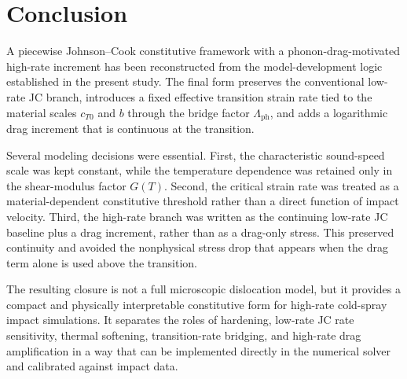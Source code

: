 \section{Conclusion}
A piecewise Johnson--Cook constitutive framework with a phonon-drag-motivated high-rate increment has been reconstructed from the model-development logic established in the present study. The final form preserves the conventional low-rate JC branch, introduces a fixed effective transition strain rate tied to the material scales $c_{T0}$ and $b$ through the bridge factor $\Lambda_{\mathrm{ph}}$, and adds a logarithmic drag increment that is continuous at the transition.

Several modeling decisions were essential. First, the characteristic sound-speed scale was kept constant, while the temperature dependence was retained only in the shear-modulus factor $G(T)$. Second, the critical strain rate was treated as a material-dependent constitutive threshold rather than a direct function of impact velocity. Third, the high-rate branch was written as the continuing low-rate JC baseline plus a drag increment, rather than as a drag-only stress. This preserved continuity and avoided the nonphysical stress drop that appears when the drag term alone is used above the transition.

The resulting closure is not a full microscopic dislocation model, but it provides a compact and physically interpretable constitutive form for high-rate cold-spray impact simulations. It separates the roles of hardening, low-rate JC rate sensitivity, thermal softening, transition-rate bridging, and high-rate drag amplification in a way that can be implemented directly in the numerical solver and calibrated against impact data.
